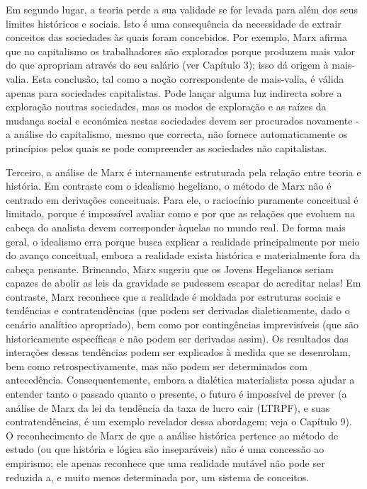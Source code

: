 Em segundo lugar, a teoria perde a sua validade se for levada para além dos seus limites históricos e sociais. Isto é uma consequência da necessidade de extrair conceitos das sociedades às quais foram concebidos. Por exemplo, Marx afirma que no capitalismo os trabalhadores são explorados porque produzem mais valor do que apropriam através do seu salário (ver Capítulo {\color{blue}3}); isso dá origem à mais-valia. Esta conclusão, tal como a noção correspondente de mais-valia, é válida apenas para sociedades capitalistas. Pode lançar alguma luz indirecta sobre a exploração noutras sociedades, mas os modos de exploração e as raízes da mudança social e económica nestas sociedades devem ser procurados novamente - a análise do capitalismo, mesmo que correcta, não fornece automaticamente os princípios pelos quais se pode compreender as sociedades não capitalistas.
 \par 
Terceiro, a análise de Marx é internamente estruturada pela relação entre teoria e história. Em contraste com o idealismo hegeliano, o método de Marx não é centrado em derivações conceituais. Para ele, o raciocínio puramente conceitual é limitado, porque é impossível avaliar como e por que as relações que evoluem na cabeça do analista devem corresponder àquelas no mundo real. De forma mais geral, o idealismo erra porque busca explicar a realidade principalmente por meio do avanço conceitual, embora a realidade exista histórica e materialmente fora da cabeça pensante. Brincando, Marx sugeriu que os Jovens Hegelianos seriam capazes de abolir as leis da gravidade se pudessem escapar de acreditar nelas! Em contraste, Marx reconhece que a realidade é moldada por estruturas sociais e tendências e contratendências (que podem ser derivadas dialeticamente, dado o cenário analítico apropriado), bem como por contingências imprevisíveis (que são historicamente específicas e não podem ser derivadas assim). Os resultados das interações dessas tendências podem ser explicados à medida que se desenrolam, bem como retrospectivamente, mas não podem ser determinados com antecedência. Consequentemente, embora a dialética materialista possa ajudar a entender tanto o passado quanto o presente, o futuro é impossível de prever (a análise de Marx da lei da tendência da taxa de lucro cair (LTRPF), e suas contratendências, é um exemplo revelador dessa abordagem; veja o Capítulo {\color{blue}9}). O reconhecimento de Marx de que a análise histórica pertence ao método de estudo (ou que história e lógica são inseparáveis) não é uma concessão ao empirismo; ele apenas reconhece que uma realidade mutável não pode ser reduzida a, e muito menos determinada por, um sistema de conceitos.
